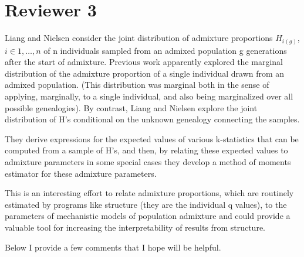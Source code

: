\documentclass[11pt]{amsart}
\begin{document}
\section{Reviewer 3}
Liang and Nielsen consider the joint distribution of admixture proportions
$H_{i(g)}$, $i\in 1,\ldots, n$ of n individuals sampled from an admixed
population g generations after the start of admixture. Previous work apparently
explored the marginal distribution of the admixture proportion of a single
individual drawn from an admixed population. (This distribution was marginal
both in the sense of applying, marginally, to a single individual, and also
being marginalized over all possible genealogies). By contrast, Liang and
Nielsen explore the joint distribution of H's conditional on the unknown
genealogy connecting the samples.

They derive expressions for the expected values of various k-statistics that can
be computed from a sample of H's, and then, by relating these expected values to
admixture parameters in some special cases they develop a method of moments
estimator for these admixture parameters.

This is an interesting effort to relate admixture proportions, which are
routinely estimated by programs like structure (they are the individual q
values), to the parameters of mechanistic models of population admixture and
could provide a valuable tool for increasing the interpretability of results
from structure.

Below I provide a few comments that I hope will be helpful.
\end{document}

